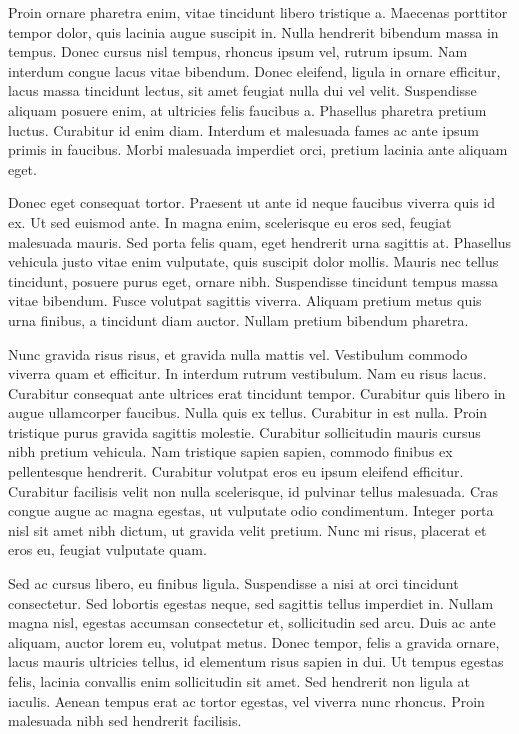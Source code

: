\documentclass{article}
\begin{document}
Proin ornare pharetra enim, vitae tincidunt libero tristique a. Maecenas porttitor tempor dolor, quis lacinia augue suscipit in. Nulla hendrerit bibendum massa in tempus. Donec cursus nisl tempus, rhoncus ipsum vel, rutrum ipsum. Nam interdum congue lacus vitae bibendum. Donec eleifend, ligula in ornare efficitur, lacus massa tincidunt lectus, sit amet feugiat nulla dui vel velit. Suspendisse aliquam posuere enim, at ultricies felis faucibus a. Phasellus pharetra pretium luctus. Curabitur id enim diam. Interdum et malesuada fames ac ante ipsum primis in faucibus. Morbi malesuada imperdiet orci, pretium lacinia ante aliquam eget.

Donec eget consequat tortor. Praesent ut ante id neque faucibus viverra quis id ex. Ut sed euismod ante. In magna enim, scelerisque eu eros sed, feugiat malesuada mauris. Sed porta felis quam, eget hendrerit urna sagittis at. Phasellus vehicula justo vitae enim vulputate, quis suscipit dolor mollis. Mauris nec tellus tincidunt, posuere purus eget, ornare nibh. Suspendisse tincidunt tempus massa vitae bibendum. Fusce volutpat sagittis viverra. Aliquam pretium metus quis urna finibus, a tincidunt diam auctor. Nullam pretium bibendum pharetra.

Nunc gravida risus risus, et gravida nulla mattis vel. Vestibulum commodo viverra quam et efficitur. In interdum rutrum vestibulum. Nam eu risus lacus. Curabitur consequat ante ultrices erat tincidunt tempor. Curabitur quis libero in augue ullamcorper faucibus. Nulla quis ex tellus. Curabitur in est nulla. Proin tristique purus gravida sagittis molestie. Curabitur sollicitudin mauris cursus nibh pretium vehicula. Nam tristique sapien sapien, commodo finibus ex pellentesque hendrerit. Curabitur volutpat eros eu ipsum eleifend efficitur. Curabitur facilisis velit non nulla scelerisque, id pulvinar tellus malesuada. Cras congue augue ac magna egestas, ut vulputate odio condimentum. Integer porta nisl sit amet nibh dictum, ut gravida velit pretium. Nunc mi risus, placerat et eros eu, feugiat vulputate quam.

Sed ac cursus libero, eu finibus ligula. Suspendisse a nisi at orci tincidunt consectetur. Sed lobortis egestas neque, sed sagittis tellus imperdiet in. Nullam magna nisl, egestas accumsan consectetur et, sollicitudin sed arcu. Duis ac ante aliquam, auctor lorem eu, volutpat metus. Donec tempor, felis a gravida ornare, lacus mauris ultricies tellus, id elementum risus sapien in dui. Ut tempus egestas felis, lacinia convallis enim sollicitudin sit amet. Sed hendrerit non ligula at iaculis. Aenean tempus erat ac tortor egestas, vel viverra nunc rhoncus. Proin malesuada nibh sed hendrerit facilisis.
\end{document}
